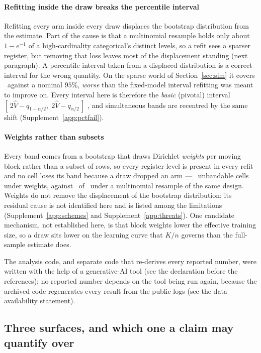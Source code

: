 \paragraph{Refitting inside the draw breaks the percentile interval}
Refitting every arm inside every draw displaces the bootstrap distribution
from the estimate. Part of the cause is that a multinomial resample holds
only about $1 - e^{-1}$ of a high-cardinality categorical's distinct levels,
so a refit sees a sparser register, but removing that loss leaves most of
the displacement standing (next paragraph). A percentile interval taken from
a displaced distribution is a correct interval for the wrong quantity. On the sparse world of Section~\ref{sec:sim} it covers
\coverageSparsePct\ against a nominal $95\%$, \emph{worse} than the
fixed-model interval refitting was meant to improve on. Every interval here
is therefore the \emph{basic} (pivotal) interval
$[\,2\hat{V} - q_{1-\alpha/2},\; 2\hat{V} - q_{\alpha/2}\,]$
\citep{davison1997bootstrap}, and simultaneous bands are recentred by the
same shift (Supplement~\ref{app:pctfail}).

\paragraph{Weights rather than subsets}
Every band comes from a bootstrap that draws Dirichlet \emph{weights} per
moving block rather than a subset of rows, so every register level is present
in every refit and no cell loses its band because a draw dropped an arm ---
\nUnbandableCells\ unbandable cells under weights, against
\nUnbandableSameDesign\ of \nUnbandableSameDesignOf\ under a multinomial
resample of the same design. Weights do not remove the displacement of the
bootstrap distribution; its residual cause is not identified here and is
listed among the limitations (Supplement~\ref{app:schemes} and
Supplement~\ref{app:threats}). One candidate mechanism, not established
here, is that block weights lower the effective training size, so a draw sits
lower on the learning curve that $K/n$ governs than the full-sample estimate
does.

The analysis code, and separate code that re-derives every reported number,
were written with the help of a generative-AI tool (see the declaration
before the references); no reported number depends on the tool being run
again, because the archived code regenerates every result from the public
logs (see the data availability statement).

\subsection{Three surfaces, and which one a claim may quantify over}
\label{sec:threesurfaces}

